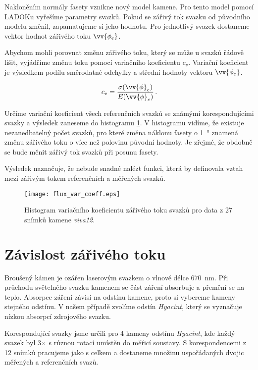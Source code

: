 	Nakloněním normály fasety vznikne nový model kamene. Pro tento model pomocí LADOKu  vyřešíme parametry svazků. Pokud se zářivý tok svazku od původního modelu změnil, zapamatujeme si jeho hodnotu. Pro jednotlivý svazek dostaneme vektor hodnot zářivého toku $\vv{\phi_e}$. 
	
	 Abychom mohli porovnat změnu zářivého toku, který se může u svazků řádově lišit, vyjádříme změnu toku pomocí variačního koeficientu $c_v$. Variační koeficient je výsledkem podílu směrodatné odchylky a střední hodnoty vektoru $\vv{\phi_e}$. 
	 
	 \begin{equation}	 
	 c_v = \frac{\sigma(\vv{\phi}_e)}{E(\vv{\phi}_e)}\,. 
	 \end{equation}
	 
Určíme variační koeficient všech referenčních svazků se známými korespondujícími svazky a výsledek zaneseme do histogramu \ref{fig: flux_var_coeff}. V histogramu vidíme, že existuje nezanedbatelný počet svazků, pro které změna náklonu fasety o \SI{1}{\degree} znamená změnu zářivého toku o více než polovinu původní hodnoty. Je zřejmé, že obdobně se bude měnit zářivý tok svazků při posunu fasety. 

 Výsledek naznačuje, že nebude snadné nalézt funkci, která by definovala vztah mezi zářivým tokem referenčních a měřených svazků.  

\begin{figure}[htps]
\centering
\texttt{[image: flux\_var\_coeff.eps]}
\caption{Histogram variačního koeficientu zářivého toku svazků pro data z 27 snímků kamene \textit{viva12}.}
\label{fig: flux_var_coeff}
\end{figure}



\section{Závislost zářivého toku}
	Broušený kámen je ozářen laserovým svazkem o vlnové délce \SI{670}{\nano\metre}. Při průchodu světelného svazku kamenem se část záření absorbuje a přemění se na teplo. Absorpce záření závisí na odstínu kamene, proto si vybereme kameny stejného odstínu. V našem případě zvolíme odstín \textit{Hyacint}, který se vyznačuje nízkou absorpcí zdrojového svazku. 
	
	Korespondující svazky jsme určili pro 4 kameny odstínu \textit{Hyacint}, kde každý svazek byl 3$\times$ s různou rotací umístěn do měřicí soustavy. S korespondencemi z 12 snímků pracujeme jako s celkem a dostaneme množinu uspořádaných dvojic měřených a referenčních svazů. 
	
